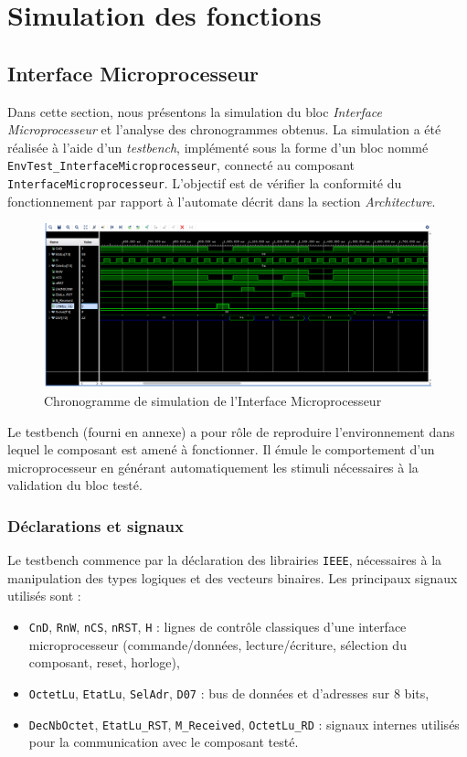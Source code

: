 \section{Simulation des fonctions}

\subsection{Interface Microprocesseur}

Dans cette section, nous présentons la simulation du bloc \textit{Interface Microprocesseur} et l’analyse des chronogrammes obtenus.  
La simulation a été réalisée à l’aide d’un \textit{testbench}, implémenté sous la forme d’un bloc nommé \texttt{EnvTest\_InterfaceMicroprocesseur}, connecté au composant \texttt{InterfaceMicroprocesseur}.  
L’objectif est de vérifier la conformité du fonctionnement par rapport à l’automate décrit dans la section \textit{Architecture}.

\begin{figure}[H]
    \centering
    \includegraphics[width=0.95\linewidth]{images//Simulation/Chrono.png}
    \caption{Chronogramme de simulation de l’Interface Microprocesseur}
    \label{fig:placeholder}
\end{figure}

Le testbench (fourni en annexe) a pour rôle de reproduire l’environnement dans lequel le composant est amené à fonctionner.  
Il émule le comportement d’un microprocesseur en générant automatiquement les stimuli nécessaires à la validation du bloc testé.

\subsubsection{Déclarations et signaux}
Le testbench commence par la déclaration des librairies \texttt{IEEE}, nécessaires à la manipulation des types logiques et des vecteurs binaires.  
Les principaux signaux utilisés sont :
\begin{itemize}
  \item \texttt{CnD}, \texttt{RnW}, \texttt{nCS}, \texttt{nRST}, \texttt{H} : lignes de contrôle classiques d’une interface microprocesseur (commande/données, lecture/écriture, sélection du composant, reset, horloge),
  \item \texttt{OctetLu}, \texttt{EtatLu}, \texttt{SelAdr}, \texttt{D07} : bus de données et d’adresses sur 8 bits,
  \item \texttt{DecNbOctet}, \texttt{EtatLu\_RST}, \texttt{M\_Received}, \texttt{OctetLu\_RD} : signaux internes utilisés pour la communication avec le composant testé.
\end{itemize}

